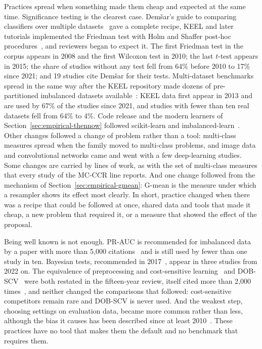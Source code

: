 

Practices spread when something made them cheap and expected at the same time. Significance testing is the clearest case. Demšar's guide to comparing classifiers over multiple datasets~\parencite{demsar2006statistical} gave a complete recipe, KEEL and later tutorials implemented the Friedman test with Holm and Shaffer post-hoc procedures~\parencite{garcia2008extension,garcia2010advanced,derrac2011practical}, and reviewers began to expect it. The first Friedman test in the corpus appears in 2008 and the first Wilcoxon test in 2010; the last $t$-test appears in 2015; the share of studies without any test fell from 64\% before 2010 to 17\% since 2021; and 19 studies cite Demšar for their tests. Multi-dataset benchmarks spread in the same way after the KEEL repository made dozens of pre-partitioned imbalanced datasets available~\parencite{alcalafdez2009keel,alcalafdez2011keel}: KEEL data first appear in 2013 and are used by 67\% of the studies since 2021, and studies with fewer than ten real datasets fell from 64\% to 4\%. Code release and the modern learners of Section~\ref{sec:empirical-thennow} followed scikit-learn and imbalanced-learn~\parencite{lemaitre2017imbalanced}. Other changes followed a change of problem rather than a tool: multi-class measures spread when the family moved to multi-class problems, and image data and convolutional networks came and went with a few deep-learning studies. Some changes are carried by lines of work, as with the set of multi-class measures that every study of the MC-CCR line reports. And one change followed from the mechanism of Section~\ref{sec:empirical-gmean}: G-mean is the measure under which a resampler shows its effect most clearly. In short, practice changed when there was a recipe that could be followed at once, shared data and tools that made it cheap, a new problem that required it, or a measure that showed the effect of the proposal.

Being well known is not enough. PR-AUC is recommended for imbalanced data by a paper with more than 5,000 citations~\parencite{saito2015precision} and is still used by fewer than one study in ten. Bayesian tests, recommended in 2017~\parencite{benavoli2017time}, appear in three studies from 2022 on. The equivalence of preprocessing and cost-sensitive learning~\parencite{lopez2012analysis} and DOB-SCV~\parencite{lopez2014importance} were both restated in the fifteen-year review, itself cited more than 2,000 times~\parencite{fernandez2018smote}, and neither changed the comparisons that followed: cost-sensitive competitors remain rare and DOB-SCV is never used. And the weakest step, choosing settings on evaluation data, became more common rather than less, although the bias it causes has been described since at least 2010~\parencite{cawley2010overfitting}. These practices have no tool that makes them the default and no benchmark that requires them.

